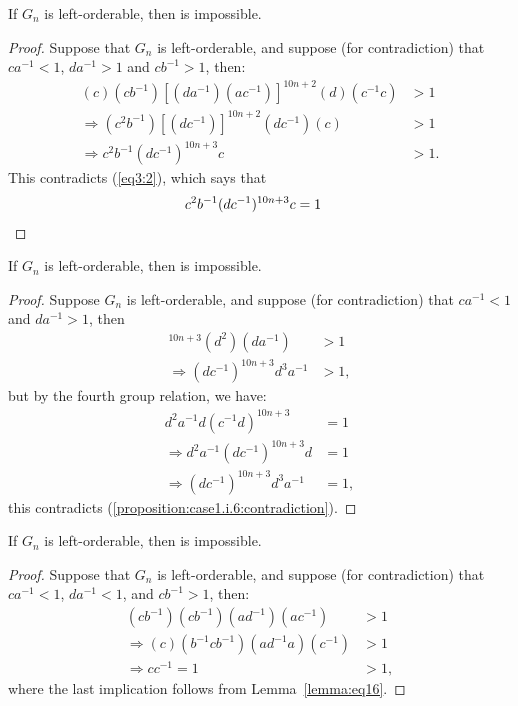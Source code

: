 \begin{proposition} If $G_n$ is left-orderable, then  is impossible.
\end{proposition}
\begin{proof} Suppose that $G_n$ is left-orderable, and suppose (for contradiction) that $ca^{-1}<1$, $da^{-1}>1$ and $cb^{-1}>1$, then:
\begin{align*}
(c)(cb^{-1})[(da^{-1})(ac^{-1})]^{10n+2}(d)(c^{-1}c)&>1\\
\Rightarrow{}(c^{2}b^{-1})[(dc^{-1})]^{10n+2}(dc^{-1})(c)&>1\\
\Rightarrow{}c^{2}b^{-1}(dc^{-1})^{10n+3}c&>1.
\end{align*}
This contradicts (\ref{eq3:2}), which says that
\begin{align*}
c^{2}b^{-1}(dc^{-1})^{10n+3}c&=1\qedhere
\end{align*}
\end{proof}

\begin{proposition} If $G_n$ is left-orderable, then  is impossible.
\end{proposition}
\begin{proof} Suppose $G_n$ is left-orderable, and suppose (for contradiction) that $ca^{-1}<1$ and $da^{-1}>1$, then
\begin{align}
[(da^{-1})(ac^{-1})]^{10n+3}(d^{2})(da^{-1})&>1\nonumber{}\\
\Rightarrow{}(dc^{-1})^{10n+3}d^{3}a^{-1}&>1,\label{proposition:case1.i.6:contradiction}
\end{align}
but by the fourth group relation, we have:
\begin{align}
d^{2}a^{-1}d(c^{-1}d)^{10n+3}&=1\nonumber{}\\
\Rightarrow{}d^{2}a^{-1}(dc^{-1})^{10n+3}d&=1\nonumber{}\\
\Rightarrow{}(dc^{-1})^{10n+3}d^{3}a^{-1}&=1,\label{eq4:2}
\end{align}
this contradicts (\ref{proposition:case1.i.6:contradiction}).
\end{proof}

\begin{proposition} If $G_n$ is left-orderable, then  is impossible.
\end{proposition}
\begin{proof} Suppose that $G_n$ is left-orderable, and suppose (for contradiction) that $ca^{-1}<1$, $da^{-1}<1$, and $cb^{-1}>1$, then: 
\begin{align*}
(cb^{-1})(cb^{-1})(ad^{-1})(ac^{-1})&>1\\
\Rightarrow{}(c)(b^{-1}cb^{-1})(ad^{-1}a)(c^{-1})&>1\\
\Rightarrow{}cc^{-1}=1&>1,
\end{align*}
where the last implication follows from Lemma~\ref{lemma:eq16}.
\end{proof}

